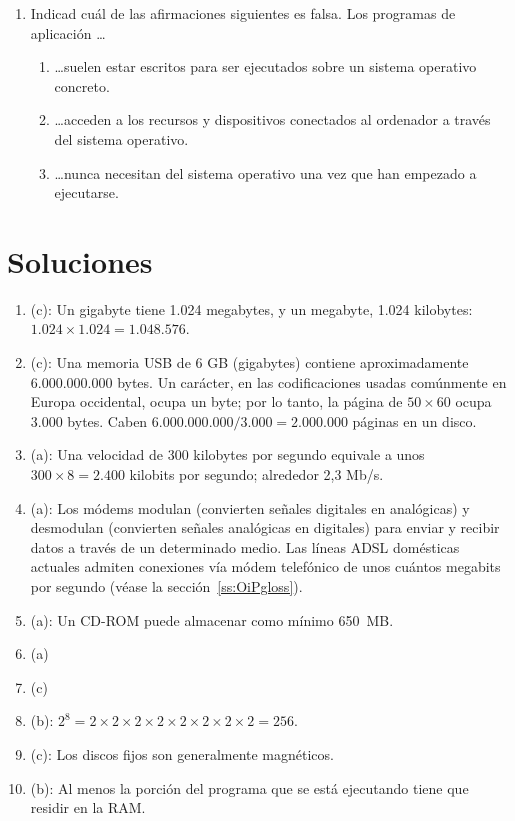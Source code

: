 \begin{enumerate}
\item Indicad cuál de las afirmaciones siguientes es falsa. Los programas de aplicación \ldots \begin{enumerate} \item \ldots suelen estar escritos para ser ejecutados sobre un sistema operativo concreto. \item \ldots acceden a los recursos y dispositivos conectados al ordenador a través del sistema operativo. \item \ldots nunca necesitan del sistema operativo una vez que han empezado a ejecutarse. \end{enumerate} 

\end{enumerate} 

\section{Soluciones} \begin{enumerate} \item (c): Un gigabyte tiene 1.024 megabytes, y un megabyte, 1.024 kilobytes: $1.024 \times 1.024 = 1.048.576$. \item (c): Una memoria USB de 6 GB (gigabytes) contiene aproximadamente 6.000.000.000 bytes. Un carácter, en las codificaciones usadas común\-mente en Europa occidental, ocupa un byte; por lo tanto, la página de $50\times60$ ocupa 3.000 bytes. Caben $6.000.000.000/3.000=2.000.000$ páginas en un disco. \item (a): Una velocidad de 300 kilobytes por segundo equivale a unos $300 \times 8=2.400$ kilobits por segundo; alrededor 2,3 Mb/s. \item (a): Los módems modulan (convierten señales digitales en analógicas) y desmodulan (convierten señales analógicas en digitales) para enviar y recibir datos a través de un determinado medio. Las líneas ADSL domésticas actuales admiten conexiones vía módem telefónico de unos cuántos megabits por segundo (véase la sección~\ref{ss:OiPgloss}). \item (a): Un CD-ROM puede almacenar como mínimo 650~MB. 

\item (a) \item (c) \item (b): $2^8=2\times 2\times 2\times 2\times 2\times 2\times 2\times 2=256$. \item (c): Los discos fijos son generalmente magnéticos. \item (b): Al menos la porción del programa que se está ejecutando tiene que residir en la RAM. 


\end{enumerate}
